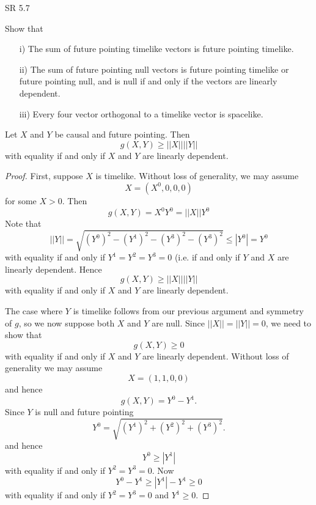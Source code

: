 \documentclass[minion]{homework}
\begin{document}
\begin{aproblems}
\hproblem SR 5.7

Show that
\begin{itemize}
\item[i)] The sum of future pointing timelike vectors is future pointing timelike.
\item[ii)] The sum of future pointing null vectors is future pointing timelike or
future pointing null, and is null if and only if the vectors are linearly dependent.
\item[iii)] Every four vector orthogonal to a timelike vector is spacelike.
\end{itemize}

\solution

\begin{lemma}\label{lem:mainlemma}
Let $X$ and $Y$ be causal and future pointing.  Then
\begin{equation}
g(X,Y) \ge ||X||||Y||
\end{equation}
with equality if and only if $X$ and $Y$ are linearly dependent.
\end{lemma}
\begin{proof}
First, suppose $X$ is timelike.  Without loss of generality, we may assume
\begin{equation}
X= (X^0,0,0,0)
\end{equation}
for some $X>0$.  Then
\begin{equation}
g(X,Y) = X^0 Y^0 = ||X|| Y^0
\end{equation}
Note that
\begin{equation}
||Y|| = \sqrt{(Y^0)^2-(Y^1)^2-(Y^3)^2-(Y^3)^2} \le |Y^0| = Y^0
\end{equation}
with equality if and only if $Y^1=Y^2=Y^3=0$ (i.e. if and only if $Y$
and $X$ are linearly dependent. Hence
\begin{equation}
g(X,Y) \ge ||X|| ||Y||
\end{equation}
with equality if and only if $X$ and $Y$ are linearly dependent.

The case where $Y$ is timelike follows from our previous argument and symmetry
of $g$, so we now suppose both $X$ and $Y$ are null. Since $||X||=||Y||=0$,
we need to show that
\begin{equation}
g(X,Y) \ge 0
\end{equation}
with equality if and only if $X$ and $Y$ are linearly dependent.
Without loss of 
generality we may assume 
\begin{equation}
X=(1,1,0,0)
\end{equation}
and hence
\begin{equation}
g(X,Y) = Y^0 - Y^1.
\end{equation}
Since $Y$ is null and future pointing
\begin{equation}
Y^0 = \sqrt{(Y^1)^2+(Y^2)^2+(Y^3)^2}.
\end{equation}
and hence
\begin{equation}
Y^0 \ge |Y^1|
\end{equation}
with equality if and only if $Y^2=Y^3=0$.
Now
\begin{equation}
Y^0 - Y^1 \ge |Y^1|-Y^1 \ge 0
\end{equation}
with equality if and only if $Y^2=Y^3=0$ and $Y^1\ge 0$.


\end{proof}
\end{aproblems}
\end{document}
